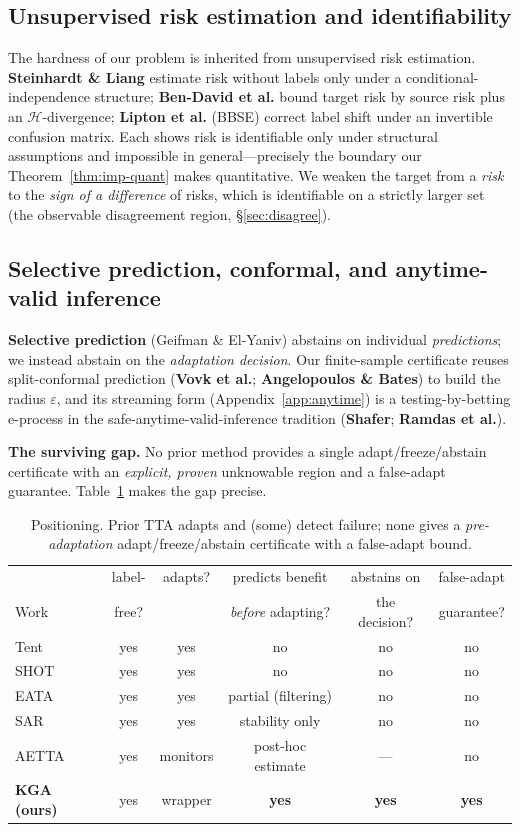 \documentclass[11pt]{article}
\theoremstyle{plain}
\theoremstyle{definition}
\begin{document}
\subsection{Unsupervised risk estimation and identifiability}
The hardness of our problem is inherited from unsupervised risk estimation.
\textbf{Steinhardt \& Liang} estimate risk without labels only under a conditional-independence
structure; \textbf{Ben-David et al.} bound target risk by source risk plus an
$\mathcal{H}$-divergence; \textbf{Lipton et al.} (BBSE) correct label shift under an invertible
confusion matrix. Each shows risk is identifiable only under structural assumptions and
impossible in general---precisely the boundary our Theorem~\ref{thm:imp-quant} makes
quantitative. We weaken the target from a \emph{risk} to the \emph{sign of a difference} of
risks, which is identifiable on a strictly larger set (the observable disagreement region,
\S\ref{sec:disagree}).

\subsection{Selective prediction, conformal, and anytime-valid inference}
\textbf{Selective prediction} (Geifman \& El-Yaniv) abstains on individual \emph{predictions};
we instead abstain on the \emph{adaptation decision}. Our finite-sample certificate reuses
split-conformal prediction (\textbf{Vovk et al.}; \textbf{Angelopoulos \& Bates}) to build the
radius $\varepsilon$, and its streaming form (Appendix~\ref{app:anytime}) is a
testing-by-betting e-process in the safe-anytime-valid-inference tradition (\textbf{Shafer};
\textbf{Ramdas et al.}).

\noindent\textbf{The surviving gap.} No prior method provides a single adapt/freeze/abstain
certificate with an \emph{explicit, proven} unknowable region and a false-adapt guarantee.
Table~\ref{tab:rel} makes the gap precise.

\begin{table}[h]\centering\small
\begin{tabular}{lccccc}
\toprule
 & label- & adapts? & predicts benefit & abstains on & false-adapt \\
Work & free? & & \emph{before} adapting? & the decision? & guarantee? \\
\midrule
Tent & yes & yes & no & no & no \\
SHOT & yes & yes & no & no & no \\
EATA & yes & yes & partial (filtering) & no & no \\
SAR & yes & yes & stability only & no & no \\
AETTA & yes & monitors & post-hoc estimate & --- & no \\
\textbf{KGA (ours)} & yes & wrapper & \textbf{yes} & \textbf{yes} & \textbf{yes} \\
\bottomrule
\end{tabular}
\caption{Positioning. Prior TTA adapts and (some) detect failure; none gives a
\emph{pre-adaptation} adapt/freeze/abstain certificate with a false-adapt bound.}
\label{tab:rel}
\end{table}
\end{document}
